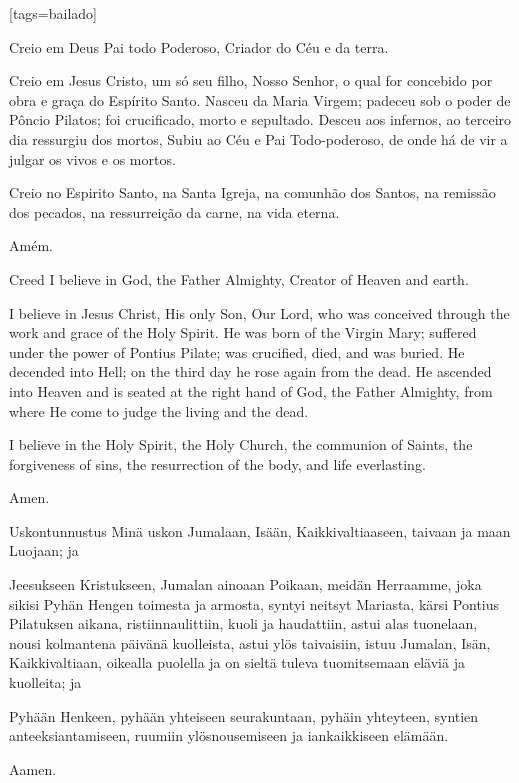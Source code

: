 \scleardpage
{}[tags={bailado}]
  \begin{passage}[PT]{}
    Creio em Deus Pai todo Poderoso,
    Criador do Céu e da terra.
    \par
    Creio em Jesus Cristo, um só seu filho, Nosso
    Senhor, o qual for concebido por obra e graça do
    Espírito Santo. Nasceu da Maria Virgem;
    padeceu sob o poder de Pôncio Pilatos;
    foi crucificado, morto e sepultado. Desceu aos
    infernos, ao terceiro dia ressurgiu dos mortos,
    Subiu ao Céu e Pai Todo-poderoso, de onde há de vir
    a julgar os vivos e os mortos.
    \par
    Creio no Espirito Santo, na Santa Igreja,
    na comunhão dos Santos, na remissão
    dos pecados, na ressurreição da carne,
    na vida eterna.
    \par
    Amém.
  \end{passage}
  \hardbrk
  \begin{passage}[EN]{Creed}
    I believe in God, the Father Almighty,
    Creator of Heaven and earth.
    \par
    I believe in Jesus Christ, His only Son, Our Lord,
    who was conceived through the work and grace of
    the Holy Spirit. He was born of the Virgin Mary;
    suffered under the power of Pontius Pilate;
    was crucified, died, and was buried. He decended
    into Hell; on the third day he rose again from
    the dead. He ascended into Heaven and is seated
    at the right hand of God, the Father Almighty, from
    where He come to judge the living and the dead.
    \par
    I believe in the Holy Spirit, the Holy Church,
    the communion of Saints, the forgiveness of sins,
    the resurrection of the body, and life everlasting.
    \par
    Amen.
  \end{passage}
  \begin{passage}[FI]{Uskontunnustus}
    Minä uskon Jumalaan, Isään, Kaikkivaltiaaseen, taivaan ja maan Luojaan; ja
    \par
    Jeesukseen Kristukseen, Jumalan ainoaan Poikaan, meidän Herraamme,
    joka sikisi Pyhän Hengen toimesta ja armosta, syntyi neitsyt Mariasta,
    kärsi Pontius Pilatuksen aikana, ristiinnaulittiin, kuoli ja haudattiin,
    astui alas tuonelaan, nousi kolmantena päivänä kuolleista, astui ylös
    taivaisiin, istuu Jumalan, Isän, Kaikkivaltiaan, oikealla puolella ja on
    sieltä tuleva tuomitsemaan eläviä ja kuolleita; ja
    \par
    Pyhään Henkeen, pyhään yhteiseen seurakuntaan, pyhäin yhteyteen, syntien
    anteeksiantamiseen, ruumiin ylösnousemiseen ja iankaikkiseen elämään.
    \par
    Aamen.
  \end{passage}
\endsong


